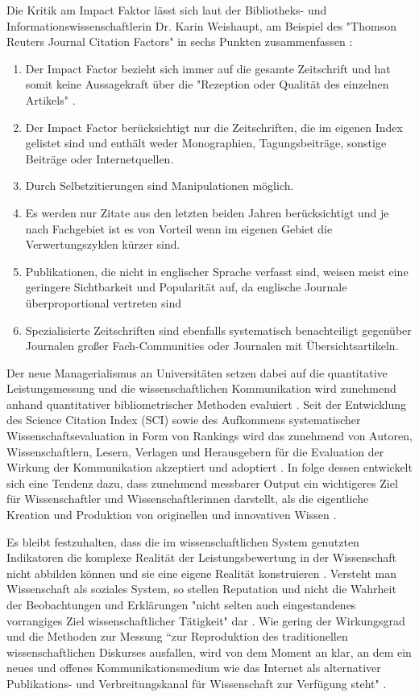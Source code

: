 Die Kritik am Impact Faktor lässt sich laut der Bibliotheks- und Informationswissenschaftlerin Dr. Karin Weishaupt, am Beispiel des "Thomson Reuters Journal Citation Factors" in sechs Punkten zusammenfassen \cite{weishaupt_2009_goldenOA}:
\begin{enumerate}
\item Der Impact Factor bezieht sich immer auf die gesamte Zeitschrift und hat somit keine Aussagekraft über die "Rezeption oder Qualität des einzelnen Artikels" \cite{weishaupt_2009_goldenOA}.
\item Der Impact Factor berücksichtigt nur die Zeitschriften, die im eigenen Index gelistet sind und enthält weder Monographien, Tagungsbeiträge, sonstige Beiträge oder Internetquellen.
\item Durch Selbstzitierungen sind Manipulationen möglich.
\item Es werden nur Zitate aus den letzten beiden Jahren berücksichtigt und je nach Fachgebiet ist es von Vorteil wenn im eigenen Gebiet die Verwertungszyklen kürzer sind.
\item Publikationen, die nicht in englischer Sprache verfasst sind, weisen meist eine geringere Sichtbarkeit und Popularität auf, da englische Journale überproportional vertreten sind
\item Spezialisierte Zeitschriften sind ebenfalls systematisch benachteiligt gegenüber Journalen großer Fach-Communities oder Journalen mit Übersichtsartikeln.
\end{enumerate}

Der neue Managerialismus an Universitäten setzen dabei auf die quantitative Leistungsmessung und die wissenschaftlichen Kommunikation wird zunehmend anhand quantitativer bibliometrischer Methoden evaluiert \cite[:40]{Frost_2014}. Seit der Entwicklung des Science Citation Index (SCI) sowie des Aufkommens systematischer Wissenschaftsevaluation in Form von Rankings wird das zunehmend von Autoren, Wissenschaftlern, Lesern, Verlagen und Herausgebern für die Evaluation der Wirkung der Kommunikation akzeptiert und adoptiert \cite[:2]{haustein_2012_multidimensional}. In folge dessen entwickelt sich eine Tendenz dazu, dass zunehmend messbarer Output ein wichtigeres Ziel für Wissenschaftler und Wissenschaftlerinnen darstellt, als die eigentliche Kreation und Produktion von originellen und innovativen Wissen \cite[:41]{Frost_2014}.

Es bleibt festzuhalten, dass die im wissenschaftlichen System genutzten Indikatoren die komplexe Realität der Leistungsbewertung in der Wissenschaft nicht abbilden können und sie eine eigene Realität konstruieren \cite{Hornbostel_1997}. Versteht man Wissenschaft als soziales System, so stellen Reputation und nicht die Wahrheit der Beobachtungen und Erklärungen "nicht selten auch eingestandenes vorrangiges Ziel wissenschaftlicher Tätigkeit" dar \cite{luhmann_1970_selbststeuerung}. Wie gering der Wirkungsgrad und die Methoden zur Messung “zur Reproduktion des traditionellen wissenschaftlichen Diskurses ausfallen, wird von dem Moment an klar, an dem ein neues und offenes Kommunikationsmedium wie das Internet als alternativer Publikations- und Verbreitungskanal für Wissenschaft zur Verfügung steht" \cite{Rost_1998}.

